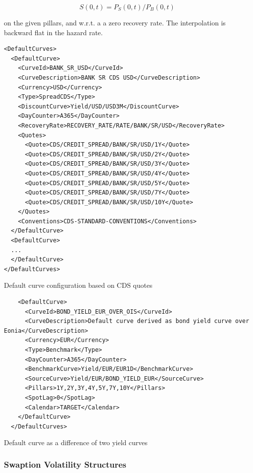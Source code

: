 \documentclass[12pt, a4paper]{article}
\newenvironment{longlisting}{\captionsetup{type=listing}}{}
\begin{document}
$$S(0,t) = P_S(0,t) / P_B(0,t)$$

on the given pillars, and w.r.t. a a zero recovery rate. The interpolation is backward flat in the hazard rate.

\begin{longlisting}
\begin{verbatim}
<DefaultCurves>
  <DefaultCurve>
    <CurveId>BANK_SR_USD</CurveId>
    <CurveDescription>BANK SR CDS USD</CurveDescription>
    <Currency>USD</Currency> 
    <Type>SpreadCDS</Type>
    <DiscountCurve>Yield/USD/USD3M</DiscountCurve>
    <DayCounter>A365</DayCounter>
    <RecoveryRate>RECOVERY_RATE/RATE/BANK/SR/USD</RecoveryRate>
    <Quotes>
      <Quote>CDS/CREDIT_SPREAD/BANK/SR/USD/1Y</Quote>
      <Quote>CDS/CREDIT_SPREAD/BANK/SR/USD/2Y</Quote>
      <Quote>CDS/CREDIT_SPREAD/BANK/SR/USD/3Y</Quote>
      <Quote>CDS/CREDIT_SPREAD/BANK/SR/USD/4Y</Quote>
      <Quote>CDS/CREDIT_SPREAD/BANK/SR/USD/5Y</Quote>
      <Quote>CDS/CREDIT_SPREAD/BANK/SR/USD/7Y</Quote>
      <Quote>CDS/CREDIT_SPREAD/BANK/SR/USD/10Y</Quote>
    </Quotes>
    <Conventions>CDS-STANDARD-CONVENTIONS</Conventions>
  </DefaultCurve>
  <DefaultCurve>
  ...
  </DefaultCurve>
</DefaultCurves>
\end{verbatim}
\caption{Default curve configuration based on CDS quotes}
\label{lst:defaultcurve_configuration}
\end{longlisting}

\begin{longlisting}
\begin{verbatim}
    <DefaultCurve>
      <CurveId>BOND_YIELD_EUR_OVER_OIS</CurveId>
      <CurveDescription>Default curve derived as bond yield curve over Eonia</CurveDescription>
      <Currency>EUR</Currency>
      <Type>Benchmark</Type>
      <DayCounter>A365</DayCounter>
      <BenchmarkCurve>Yield/EUR/EUR1D</BenchmarkCurve>
      <SourceCurve>Yield/EUR/BOND_YIELD_EUR</SourceCurve>
      <Pillars>1Y,2Y,3Y,4Y,5Y,7Y,10Y</Pillars>
      <SpotLag>0</SpotLag>
      <Calendar>TARGET</Calendar>
    </DefaultCurve>
  </DefaultCurves>
\end{verbatim}
\caption{Default curve as a difference of two yield curves}
\label{lst:defaultcurve_configuration_2}
\end{longlisting}

\subsubsection{Swaption Volatility Structures}
\end{document}
